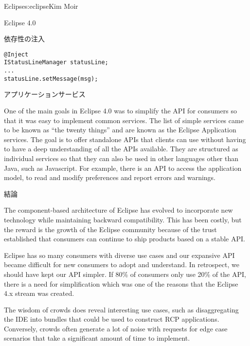 \begin{aosachapter}{Eclipse}{s:eclipse}{Kim Moir}
\begin{aosasect1}{Eclipse 4.0}
\begin{aosasect2}{依存性の注入}
\begin{verbatim}
@Inject
IStatusLineManager statusLine;
...
statusLine.setMessage(msg);
\end{verbatim}

\end{aosasect2}

\begin{aosasect2}{アプリケーションサービス}

One of the main goals in Eclipse 4.0 was to simplify the API for
consumers so that it was easy to implement common services. The list
of simple services came to be known as ``the twenty things'' and are
known as the Eclipse Application services. The goal is to offer
standalone APIs that clients can use without having to have a deep
understanding of all the APIs available. They are structured as
individual services so that they can also be used in other languages
other than Java, such as Javascript.  For example, there is an API to
access the application model, to read and modify preferences and
report errors and warnings.

\end{aosasect2}

\end{aosasect1}

\begin{aosasect1}{結論}

The component-based architecture of Eclipse has evolved to incorporate
new technology while maintaining backward compatibility.  This has
been costly, but the reward is the growth of the Eclipse community
because of the trust established that consumers can continue to ship
products based on a stable API.

Eclipse has so many consumers with diverse use cases and our expansive
API became difficult for new consumers to adopt and understand. In
retrospect, we should have kept our API simpler. If 80\% of consumers
only use 20\% of the API, there is a need for simplification which was
one of the reasons that the Eclipse 4.x stream was created.

The wisdom of crowds does reveal interesting use cases, such as
disaggregating the IDE into bundles that could be used to construct
RCP applications.  Conversely, crowds often generate a lot of noise
with requests for edge case scenarios that take a significant amount
of time to implement.


\end{aosasect1}
\end{aosachapter}
